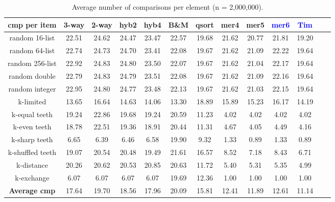 \documentclass[AMA,STIX1COL]{WileyNJD-v2}
\newcommand{\qsort}{\emph{qsort }}
\newcommand{\qsortn}{\emph{qsort}}
\begin{document}

\begin{table}
\caption{Average number of comparisons per element (n = 2,000,000).}
\centering
\begin{tabular}{|c|c|c|c|c|c|c|c|c|c|c|c|c|}
\toprule
cmp per item & 3-way & 2-way & hyb2 & hyb4 & B\&M& qsort & mer4 & mer5 & \textcolor{blue}{mer6}  & \textcolor{blue}{Tim}\\
\midrule
random 16-list	&22.51	&24.62&	24.47&	23.47&	22.57&	19.68&	21.62&	20.77&	21.81&	19.20\\
random 64-list&	22.74	&24.73	&24.70	&23.41	&22.08	&19.67	&21.62	&21.09	&22.22	&19.64\\
random 256-list&	22.92&	24.83&	24.80&	23.50&	22.07&	19.67&	21.62&	21.04&	22.17&	19.64\\
random double&	22.79	&24.83	&24.79	&23.51	&22.08	&19.67	&21.62	&21.09	&22.16	&19.64\\
random integer&	22.95	&24.80	&24.77	&23.48	&22.13	&19.67	&21.62	&21.03	&22.15	&19.64\\
k-limited&	13.65	&16.64&	14.63&	14.06&	13.30&	18.89&	15.89&	15.23&	16.17&	14.19\\
k-equal teeth&	19.24	&22.86	&19.68	&19.24	&20.59	&11.23	&4.02	&4.02	&4.02	&4.02\\
k-even teeth&	18.78&	22.51&	19.36&	18.91&	20.44&	11.31&	4.67&	4.05&	4.49&	4.16\\
k-sharp teeth&	6.65	&6.39	&6.46	&6.58	&19.90	&9.32	&1.33	&0.89	&1.33	&0.89\\
k-shuffled teeth&	19.07&	20.54&	20.48&	19.49&	21.61&	16.57&	8.52&	7.18&	8.43&	6.71\\
k-distance&	20.26	&20.62	&20.53	&20.85	&20.63	&11.72	&5.40	&5.31	&5.35&	4.99\\
k-exchange&	6.07&	6.07&	6.07&	6.07&	19.69&	12.36&	1.00&	1.00&	1.00&	1.00\\
\textbf{Average  cmp}&	17.64	&19.70	&18.56	&17.96	&20.09	&15.81	&12.41	&11.89	&12.61	&11.14\\
\bottomrule
\end{tabular}
\label{table4}
\end{table}
\end{document}
